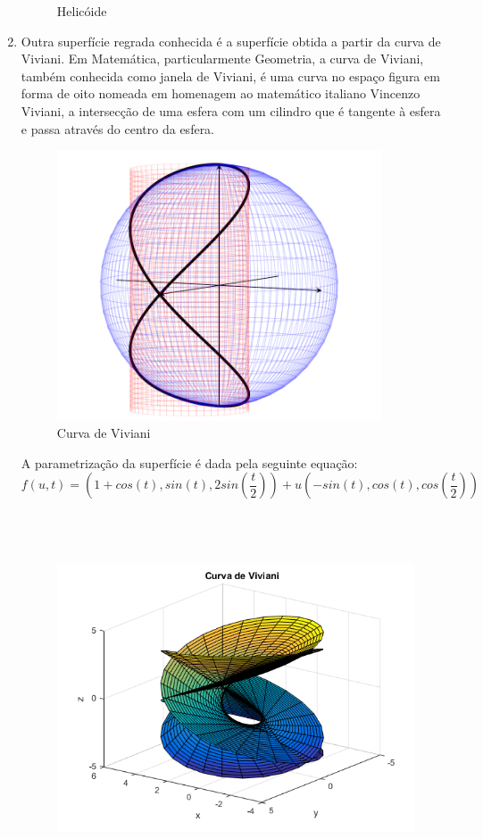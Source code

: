 \documentclass[a4paper]{article}
\begin{document}
\begin{enumerate}
\begin{figure}[H]
\caption{Helicóide}
\label{gráfico2}
\end{figure}
\item Outra superfície regrada conhecida é a superfície obtida a partir da curva de Viviani. Em Matemática, particularmente Geometria, a curva de Viviani, também conhecida como janela de Viviani, é uma curva no espaço figura em forma de oito nomeada em homenagem ao matemático italiano Vincenzo Viviani, a intersecção de uma esfera com um cilindro que é tangente à esfera e passa através do centro da esfera.
\begin{figure}[H]
\centering
\includegraphics[height=8cm]{vick.png}
\caption{Curva de Viviani}
\label{gráfico3}
\end{figure}
A parametrização da superfície é dada pela seguinte equação:
\\
$$f(u,t)=(1+cos(t),sin(t),2sin(\frac{t}{2}))+u(-sin(t),cos(t),cos(\frac{t}{2}))$$

\begin{figure}[H]
\centering
\includegraphics[height=11cm]{Curva_de_Viviani.png}

\end{figure}
\end{enumerate}
\end{document}
